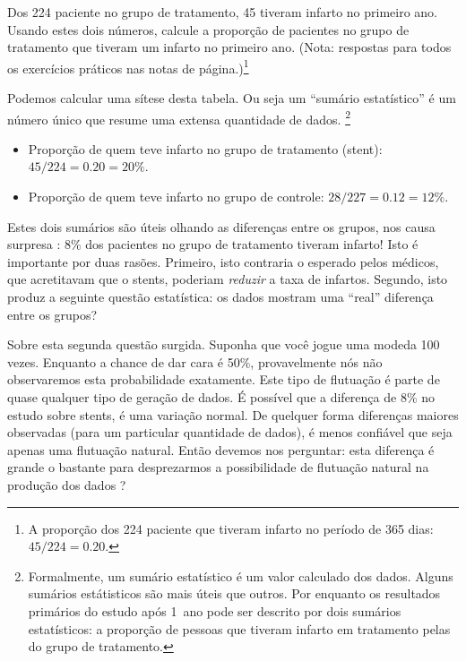 \begin{exercise}
Dos 224 paciente no grupo de tratamento, 45 tiveram infarto no primeiro ano. Usando estes dois números, calcule a proporção de pacientes no grupo de tratamento que tiveram um
    infarto no primeiro ano. (Nota: respostas para todos os exercícios práticos nas notas de página.)\footnote{A proporção dos 224 paciente que tiveram infarto no período de 365 dias: $45/224 = 0.20$.}
\end{exercise}

Podemos calcular uma sítese desta tabela. Ou seja um ``sumário estatístico'' é um número único que resume uma extensa quantidade de dados. \footnote{Formalmente, um sumário estatístico é um valor calculado dos dados. Alguns sumários estátisticos são mais úteis que outros. Por enquanto os resultados primários do estudo após 1~ano pode ser descrito por dois sumários estatísticos: a proporção de pessoas que tiveram infarto em tratamento pelas do grupo de tratamento.}

\begin{itemize}
\setlength{\itemsep}{0mm}
\item[] Proporção de quem teve infarto no grupo de tratamento (stent): $45/224 = 0.20 = 20\%$.
\item[] Proporção de quem teve infarto no grupo de controle: $28/227 = 0.12 = 12\%$.
\end{itemize}

Estes dois sumários são úteis olhando as diferenças entre os grupos, nos causa surpresa : 8\% dos pacientes no grupo de tratamento tiveram infarto! Isto é importante por duas rasões. Primeiro, isto contraria o esperado pelos médicos, que acretitavam que o stents, poderiam \emph{reduzir} a taxa de infartos. Segundo, isto produz a seguinte questão estatística: os dados mostram uma ``real'' diferença entre os grupos?

Sobre esta segunda questão surgida. Suponha que você jogue uma modeda 100 vezes. Enquanto a chance de dar cara é 50\%, provavelmente nós não observaremos esta probabilidade exatamente. Este tipo de flutuação é parte de quase qualquer tipo de geração de dados. É possível que a diferença de 8\% no estudo sobre stents, é uma variação normal. De quelquer forma diferenças maiores observadas (para um particular quantidade de dados), é menos confiável que seja apenas uma flutuação natural. Então devemos nos perguntar: esta diferença é grande o bastante para desprezarmos a possibilidade de flutuação natural na produção dos dados ?

